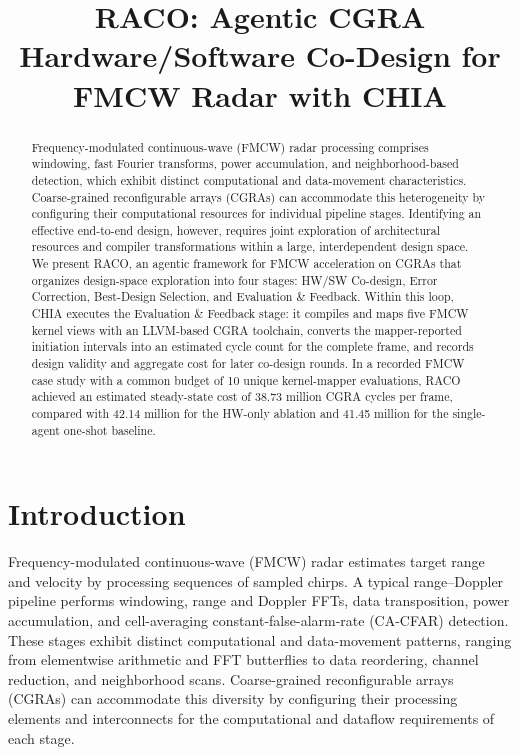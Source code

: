 \documentclass[conference,letterpaper]{IEEEtran}
\title{RACO: Agentic CGRA Hardware/Software Co-Design for FMCW Radar with CHIA}
\author{\IEEEauthorblockN{Zesong Jiang, Cheng Tan, Jeff Zhang}
\IEEEauthorblockA{Arizona State University}}
\begin{document}
\maketitle
\begin{abstract}
Frequency-modulated continuous-wave (FMCW) radar processing comprises windowing, fast Fourier transforms, power accumulation, and neighborhood-based detection, which exhibit distinct computational and data-movement characteristics. Coarse-grained reconfigurable arrays (CGRAs) can accommodate this heterogeneity by configuring their computational resources for individual pipeline stages. Identifying an effective end-to-end design, however, requires joint exploration of architectural resources and compiler transformations within a large, interdependent design space. We present RACO, an agentic framework for FMCW acceleration on CGRAs that organizes design-space exploration into four stages: HW/SW Co-design, Error Correction, Best-Design Selection, and Evaluation \& Feedback. Within this loop, CHIA executes the Evaluation \& Feedback stage: it compiles and maps five FMCW kernel views with an LLVM-based CGRA toolchain, converts the mapper-reported initiation intervals into an estimated cycle count for the complete frame, and records design validity and aggregate cost for later co-design rounds. In a recorded FMCW case study with a common budget of 10 unique kernel-mapper evaluations, RACO achieved an estimated steady-state cost of 38.73 million CGRA cycles per frame, compared with 42.14 million for the HW-only ablation and 41.45 million for the single-agent one-shot baseline.


\end{abstract}

\section{Introduction}
Frequency-modulated continuous-wave (FMCW) radar estimates target range and velocity by processing sequences of sampled chirps. A typical range--Doppler pipeline performs windowing, range and Doppler FFTs, data transposition, power accumulation, and cell-averaging constant-false-alarm-rate (CA-CFAR) detection. These stages exhibit distinct computational and data-movement patterns, ranging from elementwise arithmetic and FFT butterflies to data reordering, channel reduction, and neighborhood scans. Coarse-grained reconfigurable arrays (CGRAs) can accommodate this diversity by configuring their processing elements and interconnects for the computational and dataflow requirements of each stage.
\end{document}
